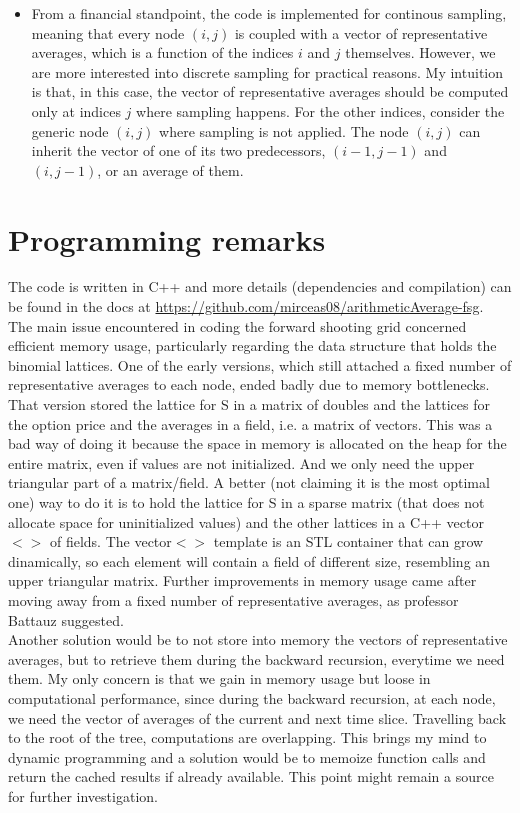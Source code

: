 \documentclass[12pt]{article}
\numberwithin{equation}{section}
\begin{document}
\begin{itemize}
\item From a financial standpoint, the code is implemented for continous sampling, meaning that every node $(i,j)$ is coupled with a vector of representative averages, which is a function of the indices $i$ and $j$ themselves. However, we are more interested into discrete sampling for practical reasons. My intuition is that, in this case, the vector of representative averages should be computed only at indices $j$ where sampling happens. For the other indices, consider the generic node $(i,j)$ where sampling is not applied. The node $(i,j)$ can inherit the vector of one of its two predecessors, $(i-1,j-1)$ and $(i,j-1)$, or an average of them.
\end{itemize}

\section{Programming remarks}
The code is written in C++ and more details (dependencies and compilation) can be found in the docs at \url{https://github.com/mirceas08/arithmeticAverage-fsg}. The main issue encountered in coding the forward shooting grid concerned efficient memory usage, particularly regarding the data structure that holds the binomial lattices. One of the early versions, which still attached a fixed number of representative averages to each node, ended badly due to memory bottlenecks. That version stored the lattice for S in a matrix of doubles and the lattices for the option price and the averages in a field, i.e. a matrix of vectors. This was a bad way of doing it because the space in memory is allocated on the heap for the entire matrix, even if values are not initialized. And we only need the upper triangular part of a matrix/field. A better (not claiming it is the most optimal one) way to do it is to hold the lattice for S in a sparse matrix (that does not allocate space for uninitialized values) and the other lattices in a C++ vector$<>$ of fields. The vector$<>$ template is an STL container that can grow dinamically, so each element will contain a field of different size, resembling an upper triangular matrix. Further improvements in memory usage came after moving away from a fixed number of representative averages, as professor Battauz suggested. \\
\newline
Another solution would be to not store into memory the vectors of representative averages, but to retrieve them during the backward recursion, everytime we need them. My only concern is that we gain in memory usage but loose in computational performance, since during the backward recursion, at each node, we need the vector of averages of the current and next time slice. Travelling back to the root of the tree, computations are overlapping. This brings my mind to dynamic programming and a solution would be to memoize function calls and return the cached results if already available. This point might remain a source for further investigation.
\end{document}
